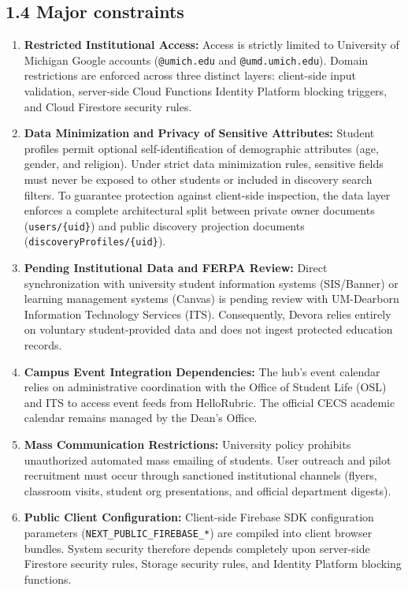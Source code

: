 \documentclass[11pt,letterpaper]{article}
\begin{document}
\subsection*{1.4 Major constraints}

\begin{enumerate}[leftmargin=*,itemsep=4pt]
\item \textbf{Restricted Institutional Access:} Access is strictly limited to University of Michigan Google accounts (\texttt{@umich.edu} and \texttt{@umd.umich.edu}). Domain restrictions are enforced across three distinct layers: client-side input validation, server-side Cloud Functions Identity Platform blocking triggers, and Cloud Firestore security rules.
\item \textbf{Data Minimization and Privacy of Sensitive Attributes:} Student profiles permit optional self-identification of demographic attributes (age, gender, and religion). Under strict data minimization rules, sensitive fields must never be exposed to other students or included in discovery search filters. To guarantee protection against client-side inspection, the data layer enforces a complete architectural split between private owner documents (\texttt{users/\{uid\}}) and public discovery projection documents (\texttt{discoveryProfiles/}\allowbreak\texttt{\{uid\}}).
\item \textbf{Pending Institutional Data and FERPA Review:} Direct synchronization with university student information systems (SIS/Banner) or learning management systems (Canvas) is pending review with UM-Dearborn Information Technology Services (ITS). Consequently, Devora relies entirely on voluntary student-provided data and does not ingest protected education records.
\item \textbf{Campus Event Integration Dependencies:} The hub's event calendar relies on administrative coordination with the Office of Student Life (OSL) and ITS to access event feeds from HelloRubric. The official CECS academic calendar remains managed by the Dean's Office.
\item \textbf{Mass Communication Restrictions:} University policy prohibits unauthorized automated mass emailing of students. User outreach and pilot recruitment must occur through sanctioned institutional channels (flyers, classroom visits, student org presentations, and official department digests).
\item \textbf{Public Client Configuration:} Client-side Firebase SDK configuration parameters (\texttt{NEXT\_PUBLIC\_}\allowbreak\texttt{FIREBASE\_*}) are compiled into client browser bundles. System security therefore depends completely upon server-side Firestore security rules, Storage security rules, and Identity Platform blocking functions.
\end{enumerate}
\end{document}
